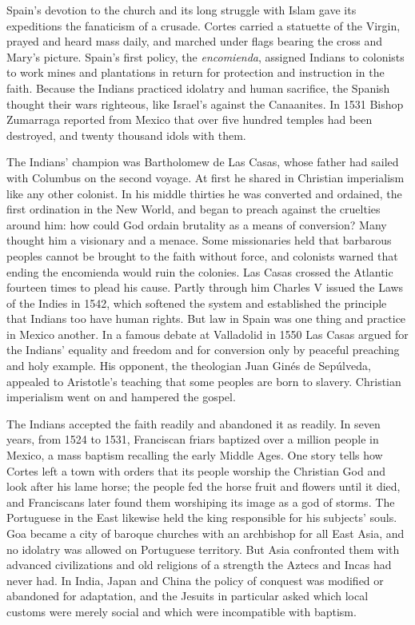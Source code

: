 Spain's devotion to the church and its long struggle with Islam gave its expeditions the fanaticism
of a crusade. Cortes carried a statuette of the Virgin, prayed and heard mass daily, and marched
under flags bearing the cross and Mary's picture. Spain's first policy, the \emph{encomienda},
assigned Indians to colonists to work mines and plantations in return for protection and instruction
in the faith. Because the Indians practiced idolatry and human sacrifice, the Spanish thought their
wars righteous, like Israel's against the Canaanites. In 1531 Bishop Zumarraga reported from Mexico
that over five hundred temples had been destroyed, and twenty thousand idols with them.

The Indians' champion was Bartholomew de Las Casas, whose father had sailed with Columbus on the
second voyage. At first he shared in Christian imperialism like any other colonist. In his middle
thirties he was converted and ordained, the first ordination in the New World, and began to preach
against the cruelties around him: how could God ordain brutality as a means of conversion? Many
thought him a visionary and a menace. Some missionaries held that barbarous peoples cannot be brought
to the faith without force, and colonists warned that ending the encomienda would ruin the colonies.
Las Casas crossed the Atlantic fourteen times to plead his cause. Partly through him Charles V issued
the Laws of the Indies in 1542, which softened the system and established the principle that Indians
too have human rights. But law in Spain was one thing and practice in Mexico another. In a famous
debate at Valladolid in 1550 Las Casas argued for the Indians' equality and freedom and for conversion
only by peaceful preaching and holy example. His opponent, the theologian Juan Gin\'es de Sep\'ulveda,
appealed to Aristotle's teaching that some peoples are born to slavery. Christian imperialism went
on and hampered the gospel.

The Indians accepted the faith readily and abandoned it as readily. In seven years, from 1524 to 1531, Franciscan friars baptized over a million people in Mexico, a mass baptism recalling the early Middle Ages.
One story tells how Cortes left a town with orders that its people worship the Christian God and look after his lame horse; the people fed the horse fruit and flowers until it died, and Franciscans later found
them worshiping its image as a god of storms. The Portuguese in the East likewise
held the king responsible for his subjects' souls. Goa became a city of baroque churches with an
archbishop for all East Asia, and no idolatry was allowed on Portuguese territory. But Asia confronted them with advanced civilizations and old religions of a strength the Aztecs and Incas had never had. In India, Japan and China the policy of conquest was modified or abandoned for adaptation, and
the Jesuits in particular asked which local customs were merely social and which were incompatible
with baptism.

